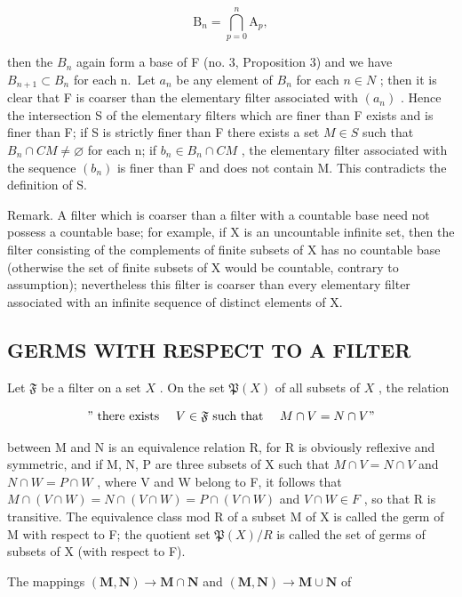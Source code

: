 \[
\mathrm{B} _ {n} = \bigcap_ {p = 0} ^ {n} \mathrm{A} _ {p},
\]

then the \(B_{n}\) again form a base of F (no. 3, Proposition 3) and we have \(B_{n+1} \subset B_{n}\) for each n.~Let \(a_{n}\) be any element of \(B_{n}\) for each \(n \in N\) ; then it is clear that F is coarser than the elementary filter associated with \((a_{n})\) . Hence the intersection S of the elementary filters which are finer than F exists and is finer than F; if S is strictly finer than F there exists a set \(M \in S\) such that \(B_{n} \cap CM \neq \varnothing\) for each n; if \(b_{n} \in B_{n} \cap CM\) , the elementary filter associated with the sequence \((b_{n})\) is finer than F and does not contain M. This contradicts the definition of S.

Remark. A filter which is coarser than a filter with a countable base need not possess a countable base; for example, if X is an uncountable infinite set, then the filter consisting of the complements of finite subsets of X has no countable base (otherwise the set of finite subsets of X would be countable, contrary to assumption); nevertheless this filter is coarser than every elementary filter associated with an infinite sequence of distinct elements of X.

\subsection{GERMS WITH RESPECT TO A FILTER}

Let \(\mathfrak{F}\) be a filter on a set \(X\) . On the set \(\mathfrak{P}(X)\) of all subsets of \(X\) , the relation

\[
" \text { there   exists } \quad V \in \mathfrak {F} \text { such   that } \quad M \cap V = N \cap V"
\]

between M and N is an equivalence relation R, for R is obviously reflexive and symmetric, and if M, N, P are three subsets of X such that \(M \cap V = N \cap V\) and \(N \cap W = P \cap W\) , where V and W belong to F, it follows that \(M \cap (V \cap W) = N \cap (V \cap W) = P \cap (V \cap W)\) and \(V \cap W \in F\) , so that R is transitive. The equivalence class mod R of a subset M of X is called the germ of M with respect to F; the quotient set \(\mathfrak{P}(X)/R\) is called the set of germs of subsets of X (with respect to F).

The mappings \((\mathbf{M},\mathbf{N})\to \mathbf{M}\cap \mathbf{N}\) and \((\mathbf{M},\mathbf{N})\rightarrow \mathbf{M}\cup \mathbf{N}\) of

